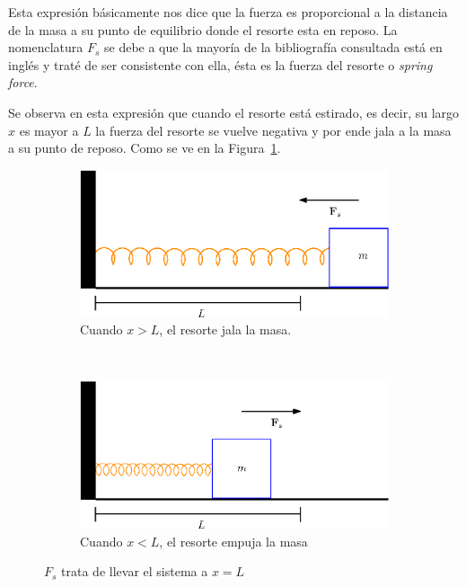 Esta expresión básicamente nos dice que la fuerza es proporcional a la distancia de la masa a su punto de equilibrio donde el resorte esta en reposo.
La nomenclatura $F_s$ se debe a que la mayoría de la bibliografía consultada está en inglés y traté de ser consistente con ella, ésta es la fuerza del resorte o \emph{\foreignlanguage{english}{spring force}}.

Se observa en esta expresión que cuando el resorte está estirado, es decir, su largo $x$ es mayor a $L$ la fuerza del resorte se vuelve negativa y por ende jala a la masa a su punto de reposo.
Como se ve en la Figura~\ref{fig:estirada}.

\begin{figure}
 \centering
  \begin{subfigure}[b]{0.5\textwidth}
    \includegraphics[width=\textwidth]{Img/01/masaEstirada}
    \caption{Cuando $x>L$, el resorte jala la masa.}
  \label{fig:estirada}
  \end{subfigure}
\\
  \begin{subfigure}[b]{0.5\textwidth}
    \includegraphics[width=\textwidth]{Img/01/masaCompresa}
    \caption{Cuando $x<L$, el resorte empuja la masa}
    \label{fig:compresa}
  \end{subfigure}
 \caption[Ley de Hooke para resortes]{ 
 $F_s$ trata de llevar el sistema a $x = L$
 } \label{leyHokke:fig}
\end{figure}

